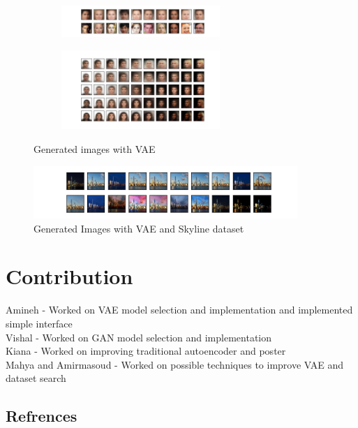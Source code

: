 \documentclass{article} %
\begin{document}
\begin{figure}[H]
\centering
\begin{subfigure}{.5\textwidth}
\includegraphics[width=6cm]{face_VAE.png}
\end{subfigure}%
\begin{subfigure}{.5\textwidth}
\includegraphics[width=6cm]{final_face_VAE.png}
\end{subfigure}
\caption{Generated images with VAE}

\end{figure}
\begin{figure}[H]
    \centering
    \includegraphics[width=10cm]{final_skyline_VAE.png}
    \caption{Generated Images with VAE and Skyline dataset}
    \label{skivae}
\end{figure}
\section{Contribution}
Amineh - Worked on VAE model selection and implementation and implemented simple interface\\
Vishal - Worked on GAN model selection and implementation\\
Kiana - Worked on improving traditional autoencoder and poster\\
Mahya and Amirmasoud - Worked on possible techniques to improve VAE and dataset search\\

\subsection*{Refrences}
    \renewcommand{\section}[2]{}


 
\end{document}
